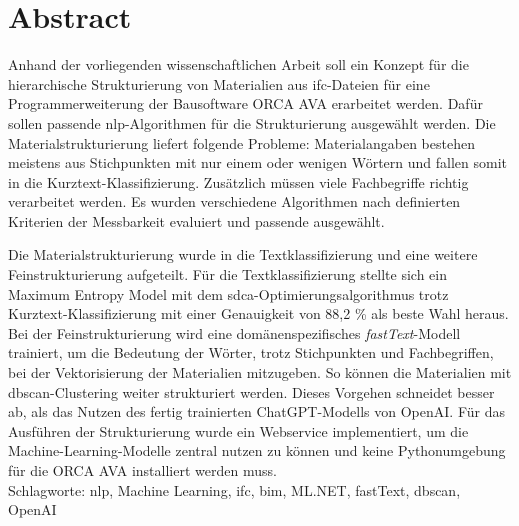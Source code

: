 \chapter*{Abstract}
Anhand der vorliegenden wissenschaftlichen Arbeit soll ein Konzept für die hierarchische Strukturierung von Materialien aus \acf{ifc}-Dateien für eine Programmerweiterung der Bausoftware ORCA AVA erarbeitet werden. Dafür sollen passende \acf{nlp}-Algorithmen für die Strukturierung ausgewählt werden. Die Materialstrukturierung liefert folgende Probleme: Materialangaben bestehen meistens aus Stichpunkten mit nur einem oder wenigen Wörtern und fallen somit in die Kurztext-Klassifizierung. Zusätzlich müssen viele Fachbegriffe richtig verarbeitet werden. Es wurden verschiedene Algorithmen nach definierten Kriterien der Messbarkeit evaluiert und passende ausgewählt.

Die Materialstrukturierung wurde in die Textklassifizierung und eine weitere Feinstrukturierung aufgeteilt. Für die Textklassifizierung stellte sich ein Maximum Entropy Model mit dem \ac{sdca}-Optimierungsalgorithmus trotz Kurztext-Klassifizierung mit einer Genauigkeit von 88,2 \% als beste Wahl heraus. Bei der Feinstrukturierung wird eine domänenspezifisches \textit{fastText}-Modell trainiert, um die Bedeutung der Wörter, trotz Stichpunkten und Fachbegriffen, bei der Vektorisierung der Materialien mitzugeben. So können die Materialien mit \acf{dbscan}-Clustering weiter strukturiert werden. Dieses Vorgehen schneidet besser ab, als das Nutzen des fertig trainierten ChatGPT-Modells von OpenAI. Für das Ausführen der Strukturierung wurde ein Webservice implementiert, um die Machine-Learning-Modelle zentral nutzen zu können und keine Pythonumgebung für die ORCA AVA installiert werden muss.\\

\noindent Schlagworte: \acs{nlp}, Machine Learning, \acs{ifc}, \acs{bim}, ML.NET, fastText, \acs{dbscan}, OpenAI

